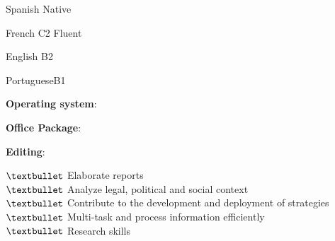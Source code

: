 \begin{skilllist}[7.1][0.7][14.8]

\begin{languagelist}
	\item{Spanish} {Native}	
	\item{French} {C2 Fluent}	
	\item{ English}  {B2}	
		\item{Portuguese}{B1}
\end{languagelist}
\vspace{-0.5cm}

\begin{flushleft}
\textbf{Operating system}:  \ponasoftos
\end{flushleft}

\begin{flushleft}
\textbf{Office Package}:  \ponasofttext
\end{flushleft}

\begin{flushleft}
\textbf{Editing}:  \ponasofttool
\end{flushleft}
\vspace{-0.7cm}

	$\textbullet$ Elaborate reports \\
	$\textbullet$ Analyze legal, political and social context\\
	$\textbullet$ Contribute to the development and deployment of strategies\\
	$\textbullet$ Multi-task and process information efficiently\\
    $\textbullet$ Research skills\\





\end{skilllist}





